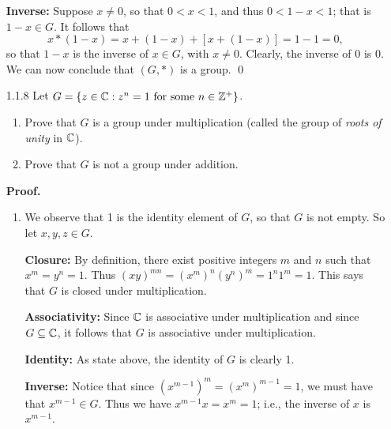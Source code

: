 \begin{enumerate}
      \textbf{Inverse:} Suppose $x \neq 0$, so that $0 < x < 1$, and thus
      $0 < 1 - x < 1$; that is $1 - x \in G$. It follows that
      $$x * (1 - x) = x + (1 - x) + [x + (1 - x)] = 1 - 1 = 0,$$
      so that $1 - x$ is the inverse of $x \in G$, with $x \neq 0$. Clearly, the 
      inverse of 0 is 0. \\

      We can now conclude that $(G, *)$ is a group. \qed
   \item[1.1.8]   Let $G = \{z \in \mathbb{C} : z^n = 1 \text{ for some } n \in \mathbb{Z}^+\}$.
                  \begin{enumerate}
                     \item Prove that $G$ is a group under multiplication
                           (called the group of \textit{roots of unity} in
                           $\mathbb{C}$).
                     \item Prove that $G$ is not a group under addition.
                  \end{enumerate}
                  
      \textbf{Proof.}
      
      \begin{enumerate}
         \item We observe that 1 is the identity element of $G$, so that $G$ is
               not empty. So let $x, y, z \in G$.
               
               \textbf{Closure:} By definition, there exist positive integers
               $m$ and $n$ such that $x^m = y^n = 1$. Thus
               $(xy)^{mn} = (x^m)^n(y^n)^m = 1^n1^m = 1$. This says that $G$ is
               closed under multiplication.
               
               \textbf{Associativity:} Since $\mathbb{C}$ is associative under
               multiplication and since $G \subseteq \mathbb{C}$, it follows that $G$ is
               associative under multiplication.
               
               \textbf{Identity:} As state above, the identity of $G$ is clearly
               1.
               
               \textbf{Inverse:} Notice that since
               $(x^{m - 1})^m = (x^m)^{m - 1} = 1$, we must have that
               $x^{m - 1} \in G$. Thus we have $x^{m - 1}x = x^m = 1$; i.e., the
               inverse of $x$ is $x^{m - 1}$.
               

\end{enumerate}
\end{enumerate}
